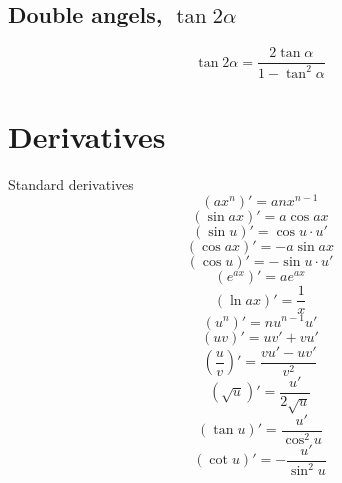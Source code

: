 \documentclass[a4paper, 10pt]{scrartcl}
\begin{document}
\subsection{Double angels, $\tan{2\alpha}$}
\[\tan{2\alpha} = \frac{2\tan{\alpha}}{1 - \tan^{2}{\alpha}}\]

\section{Derivatives}

Standard derivatives
\[(ax^{n})' = anx^{n-1}\]
\[(\sin{ax})' = a\cos{ax}\]
\[(\sin{u})' = \cos{u}\cdot u'\]
\[(\cos{ax})' = -a\sin{ax}\]
\[(\cos{u})' = -\sin{u}\cdot u'\]
\[(e^{ax})' = ae^{ax}\]
\[(\ln{ax})' = \frac{1}{x}\]
\[(u^{n})' = nu^{n-1}u'\]
\[(uv)' = uv' + vu'\]
\[\left(\frac{u}{v}\right)' = \frac{vu' - uv'}{v^{2}}\]
\[\left(\sqrt{u}\right)' = \frac{u'}{2\sqrt{u}}\]
\[(\tan{u})' = \frac{u'}{\cos^{2}{u}}\]
\[(\cot{u})' = -\frac{u'}{\sin^{2}{u}}\]
\end{document}
